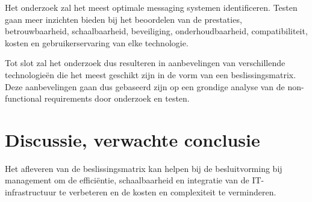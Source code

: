 

Het onderzoek zal het meest optimale messaging systemen identificeren.
Testen gaan meer inzichten bieden bij het beoordelen van de prestaties, betrouwbaarheid, 
schaalbaarheid, beveiliging, onderhoudbaarheid, compatibiliteit, kosten en gebruikerservaring van elke technologie.
\newline

Tot slot zal het onderzoek dus resulteren in aanbevelingen van verschillende technologieën die het meest geschikt zijn
in de vorm van een beslissingsmatrix. 
Deze aanbevelingen gaan dus gebaseerd zijn op een grondige analyse van de non-functional requirements 
door onderzoek en testen.


\section{Discussie, verwachte conclusie}%
\label{sec:discussie-conclusie}

Het afleveren van de beslissingsmatrix kan helpen bij de besluitvorming bij management om de efficiëntie, schaalbaarheid en integratie van de IT-infrastructuur te verbeteren
en de kosten en complexiteit te verminderen. 
